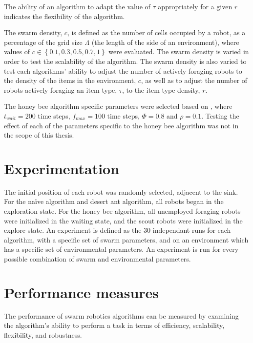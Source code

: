 The ability of an algorithm to adapt the value of $\tau$ appropriately for a given $r$ indicates the flexibility of the algorithm.

The swarm density, $c$, is defined as the number of cells occupied by a robot, as a percentage of the grid size $\Lambda$ (the length of the side of an environment), where values of $c\in\left\{0.1, 0.3, 0.5, 0.7, 1\right\}$ were evaluated. The swarm density is varied in order to test the scalability of the algorithm. The swarm density is also varied to test each algorithms' ability to adjust the number of actively foraging robots to the density of the items in the environment, $c$, as well as to adjust the number of robots actively foraging an item type, $\tau$, to the item type density, $r$.

The honey bee algorithm specific parameters were selected based on \cite{seeley2009wisdom}, where $t_{wait}=200$ time steps, $f_{max}=100$ time steps, $\Phi=0.8$ and $\rho=0.1$. Testing the effect of each of the parameters specific to the honey bee algorithm was not in the scope of this thesis.

\section{Experimentation}
\label{experimentation}

The initial position of each robot was randomly selected, adjacent to the sink. For the na\"ive algorithm and desert ant algorithm, all robots began in the exploration state. For the honey bee algorithm, all unemployed foraging robots were initialized in the waiting state, and the scout robots were initialized in the explore state. 
An experiment is defined as the 30 independant runs for each algorithm, with a specific set of swarm parameters, and on an environment which has a specific set of environmental parameters. An experiment is run for every possible combination of swarm and environmental parameters.

\section{Performance measures}
\label{thri:third:performancemeasures}

The performance of swarm robotics algorithms can be measured by examining the algorithm's ability to perform a task in terms of efficiency, scalability, flexibility, and robustness.

